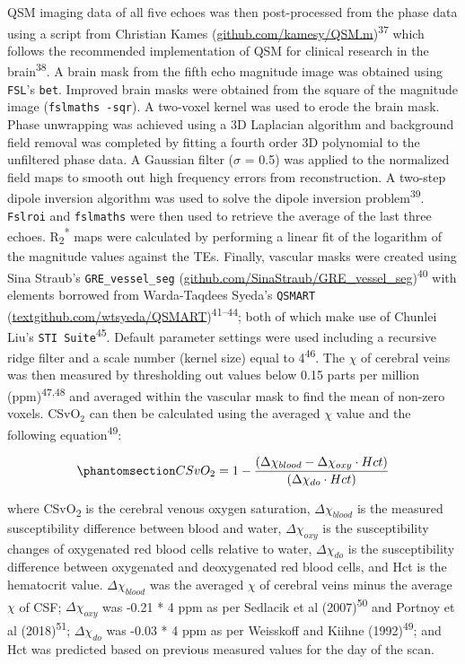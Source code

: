 \documentclass[
  letterpaper,
  DIV=11,
  numbers=noendperiod]{scrartcl}
\begin{document}
QSM imaging data of all five echoes was then post-processed from the
phase data using a script from Christian Kames
(\href{https://github.com/kamesy/QSM.m}{github.com/kamesy/QSM.m})\textsuperscript{37}
which follows the recommended implementation of QSM for clinical
research in the brain\textsuperscript{38}. A brain mask from the fifth
echo magnitude image was obtained using \texttt{FSL}'s \texttt{bet}.
Improved brain masks were obtained from the square of the magnitude
image (\texttt{fslmaths\ -sqr}). A two-voxel kernel was used to erode
the brain mask. Phase unwrapping was achieved using a 3D Laplacian
algorithm and background field removal was completed by fitting a fourth
order 3D polynomial to the unfiltered phase data. A Gaussian filter
(\(\sigma\) = 0.5) was applied to the normalized field maps to smooth
out high frequency errors from reconstruction. A two-step dipole
inversion algorithm was used to solve the dipole inversion
problem\textsuperscript{39}. \texttt{Fslroi} and \texttt{fslmaths} were
then used to retrieve the average of the last three echoes.
R\textsubscript{2}\textsuperscript{*} maps were calculated by performing
a linear fit of the logarithm of the magnitude values against the TEs.
Finally, vascular masks were created using Sina Straub's
\texttt{GRE\_vessel\_seg}
(\href{https://github.com/SinaStraub/GRE_vessel_seg}{github.com/SinaStraub/GRE\_vessel\_seg})\textsuperscript{40}
with elements borrowed from Warda-Taqdees Syeda's \texttt{QSMART}
(\href{https://github.com/wtsyeda/QSMART}{textgithub.com/wtsyeda/QSMART})\textsuperscript{41--44};
both of which make use of Chunlei Liu's
\texttt{STI\ Suite}\textsuperscript{45}. Default parameter settings were
used including a recursive ridge filter and a scale number (kernel size)
equal to 4\textsuperscript{46}. The \(\chi\) of cerebral veins was then
measured by thresholding out values below 0.15 parts per million
(ppm)\textsuperscript{47,48} and averaged within the vascular mask to
find the mean of non-zero voxels. CSvO\(_{2}\) can then be calculated
using the averaged \(\chi\) value and the following
equation\textsuperscript{49}:

\begin{equation}\phantomsection\label{eq-csvo2}{
CSvO_{2} = 1 - \frac{\left( \Delta \chi _{blood} - \Delta \chi _{oxy} \cdot Hct \right)}{\left( \Delta \chi _{do} \cdot Hct \right)}
}\end{equation}

where CSvO\textsubscript{2} is the cerebral venous oxygen saturation,
\(\Delta \chi _{blood}\) is the measured susceptibility difference
between blood and water, \(\Delta \chi _{oxy}\) is the susceptibility
changes of oxygenated red blood cells relative to water,
\(\Delta \chi _{do}\) is the susceptibility difference between
oxygenated and deoxygenated red blood cells, and Hct is the hematocrit
value. \(\Delta \chi _{blood}\) was the averaged \(\chi\) of cerebral
veins minus the average \(\chi\) of CSF; \(\Delta \chi _{oxy}\) was
-0.21 * 4 ppm as per Sedlacik et al (2007)\textsuperscript{50} and
Portnoy et al (2018)\textsuperscript{51}; \(\Delta \chi _{do}\) was
-0.03 * 4 ppm as per Weisskoff and Kiihne (1992)\textsuperscript{49};
and Hct was predicted based on previous measured values for the day of
the scan.
\end{document}
